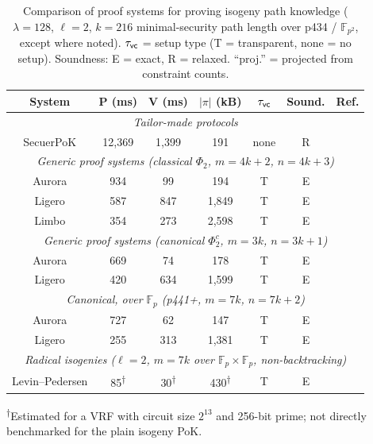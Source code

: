 \documentclass[11pt,a4paper]{article}
\theoremstyle{definition}
\theoremstyle{remark}
\newcommand{\F}{\mathbb{F}}
\begin{document}
\begin{table}[H]
	\centering
	\caption{Comparison of proof systems for proving isogeny path knowledge
		($\lambda = 128$, $\ell = 2$, $k = 216$ minimal-security path length
		over p434 / $\F_{p^2}$, except where noted).
		$\tau_{\sf vc}$ = setup type (T = transparent, none = no setup).
		Soundness: E = exact, R = relaxed.
		``proj.'' = projected from constraint counts.}
	\label{tab:isogeny-proof-systems}
	\begin{tabular}{c c c c c c c}
		\toprule
		System & P (ms) & V (ms) & $|\pi|$ (kB) & $\tau_{\sf vc}$ & Sound. & Ref. \\
		\midrule
		\multicolumn{7}{c}{\textit{Tailor-made protocols}} \\
		Secuer{}PoK
			& 12,369 & 1,399 & 191 & none & R & \cite{BCC+22} \\
		\midrule
		\multicolumn{7}{c}{\textit{Generic proof systems (classical $\Phi_2$,
			$m = 4k+2$, $n = 4k+3$)}} \\
		Aurora    & 934  & 99  & 194  & T & E & \cite{CLL23} \\
		Ligero    & 587  & 847 & 1,849 & T & E & \cite{CLL23} \\
		Limbo     & 354  & 273 & 2,598 & T & E & \cite{CLL23} \\
		\midrule
		\multicolumn{7}{c}{\textit{Generic proof systems (canonical $\Phi_2^c$,
			$m = 3k$, $n = 3k+1$)}} \\
		Aurora    & 669  & 74  & 178  & T & E & \cite{canonicalModPoly} \\
		Ligero    & 420  & 634 & 1,599 & T & E & \cite{canonicalModPoly} \\
		\midrule
		\multicolumn{7}{c}{\textit{Canonical, over $\F_p$
			(p441+, $m = 7k$, $n = 7k+2$)}} \\
		Aurora    & 727  & 62  & 147  & T & E & \cite{canonicalModPoly} \\
		Ligero    & 255  & 313 & 1,381 & T & E & \cite{canonicalModPoly} \\
		\midrule
		\multicolumn{7}{c}{\textit{Radical isogenies ($\ell = 2$, $m = 7k$ over
			$\F_p \times \F_p$, non-backtracking)}} \\
		Levin--Pedersen
			& 85\textsuperscript{$\dagger$} & 30\textsuperscript{$\dagger$}
			& 430\textsuperscript{$\dagger$} & T & E & \cite{LP24} \\
		\bottomrule
	\end{tabular}

	\smallskip
	{\footnotesize \textsuperscript{$\dagger$}Estimated for a VRF with circuit
	size $2^{13}$ and 256-bit prime; not directly benchmarked for the plain
	isogeny PoK.}
\end{table}
\end{document}
